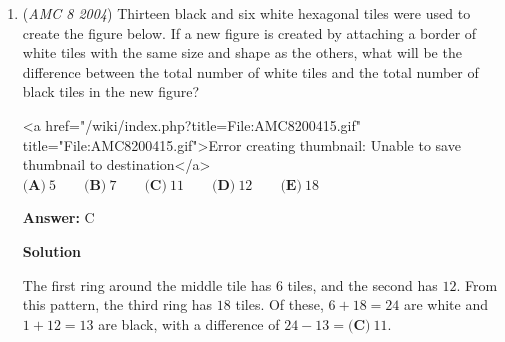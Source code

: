 \begin{enumerate}
 Divide the shape up as above. 
 \[Area = [DEGF] + [ABD] + [BCE] - [AFH] - [CGH] = 4 \cdot 10 + \frac12 \cdot 1 \cdot 3 + \frac12 \cdot 7 \cdot 6 - \frac12 \cdot 5 \cdot 4 - \frac12 \cdot 6 \cdot 10 = 40 + \frac32 + 21 - 10 - 30 = \boxed{\textbf{(C)}\ 22\frac12}\]




\textbf{Solution 2}

Let the bottom left corner be $(0,0)$. The points would then be $(4,0),(0,5),(3,4),$ and $(10,10)$. Applying the \href{https://artofproblemsolving.com/wiki/index.php?title=Shoelace\_Theorem}{Shoelace Theorem},

 
 \[\text{Area} = \frac12 \begin{vmatrix} 4 & 0 \\ 0 & 5 \\ 3 & 4 \\ 10 & 10 \\ 4 & 0\end{vmatrix} = \frac12 |(20+30)-(15+40+40)| = \frac12 |50-95| = \boxed{\textbf{(C)}\ 22\frac12}\]




\textbf{Solution 3}

The figure contains $21$ interior points and $5$ boundary points. Using \href{https://artofproblemsolving.com/wiki/index.php?title=Pick\%27s\_Theorem}{Pick's Theorem}, the area is 
 \[21+\frac{5}{2}-1=\boxed{\textbf{(C)}\ 22\frac12}\]

 \textbf{Ishan Also See} 


	\item (\textit{AMC 8 2004}) Thirteen black and six white hexagonal tiles were used to create the figure below. If a new figure is created by attaching a border of white tiles with the same size and shape as the others, what will be the difference between the total number of white tiles and the total number of black tiles in the new figure?


 
<a href="/wiki/index.php?title=File:AMC8200415.gif" title="File:AMC8200415.gif">Error creating thumbnail: Unable to save thumbnail to destination</a>
$\textbf{(A)}\ 5\qquad \textbf{(B)}\ 7\qquad \textbf{(C)}\ 11\qquad \textbf{(D)}\ 12 \qquad \textbf{(E)}\ 18$

 \textbf{Answer: }C



\textbf{Solution}

The first ring around the middle tile has $6$ tiles, and the second has $12$. From this pattern, the third ring has $18$ tiles. Of these, $6+18=24$ are white and $1+12=13$ are black, with a difference of $24-13 = \boxed{\textbf{(C)}\ 11}$.


\end{enumerate}
